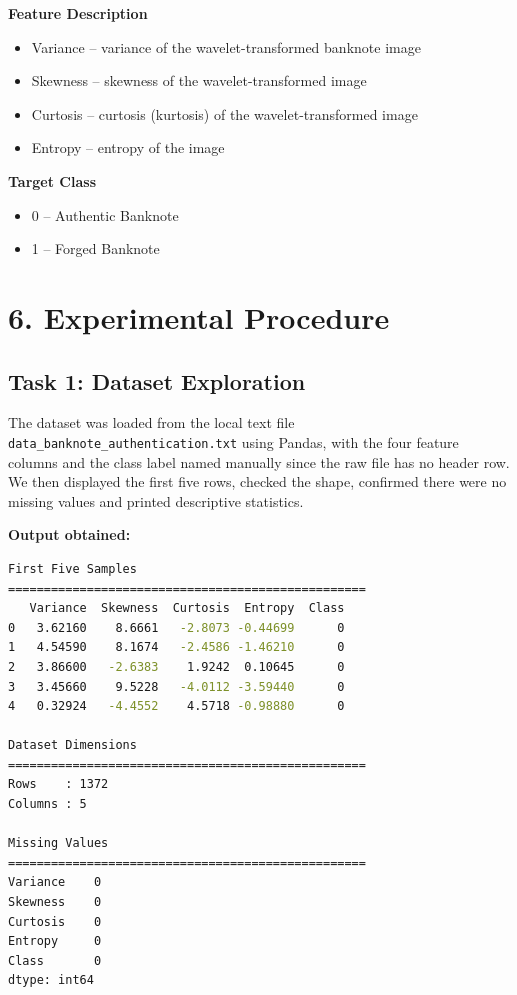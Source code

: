 \documentclass[11pt]{article}
\begin{document}
\textbf{Feature Description}
\begin{itemize}
\item Variance -- variance of the wavelet-transformed banknote image
\item Skewness -- skewness of the wavelet-transformed image
\item Curtosis -- curtosis (kurtosis) of the wavelet-transformed image
\item Entropy -- entropy of the image
\end{itemize}

\textbf{Target Class}
\begin{itemize}
\item 0 -- Authentic Banknote
\item 1 -- Forged Banknote
\end{itemize}

\section*{6. Experimental Procedure}

\subsection*{Task 1: Dataset Exploration}
The dataset was loaded from the local text file \texttt{data\_banknote\_authentication.txt} using Pandas, with the four feature columns and the class label named manually since the raw file has no header row. We then displayed the first five rows, checked the shape, confirmed there were no missing values and printed descriptive statistics.

\textbf{Output obtained:}

\begin{lstlisting}[language=bash, basicstyle=\ttfamily\scriptsize, frame=single, backgroundcolor=\color{codebg}]
First Five Samples
==================================================
   Variance  Skewness  Curtosis  Entropy  Class
0   3.62160    8.6661   -2.8073 -0.44699      0
1   4.54590    8.1674   -2.4586 -1.46210      0
2   3.86600   -2.6383    1.9242  0.10645      0
3   3.45660    9.5228   -4.0112 -3.59440      0
4   0.32924   -4.4552    4.5718 -0.98880      0

Dataset Dimensions
==================================================
Rows    : 1372
Columns : 5

Missing Values
==================================================
Variance    0
Skewness    0
Curtosis    0
Entropy     0
Class       0
dtype: int64
\end{lstlisting}
\end{document}
